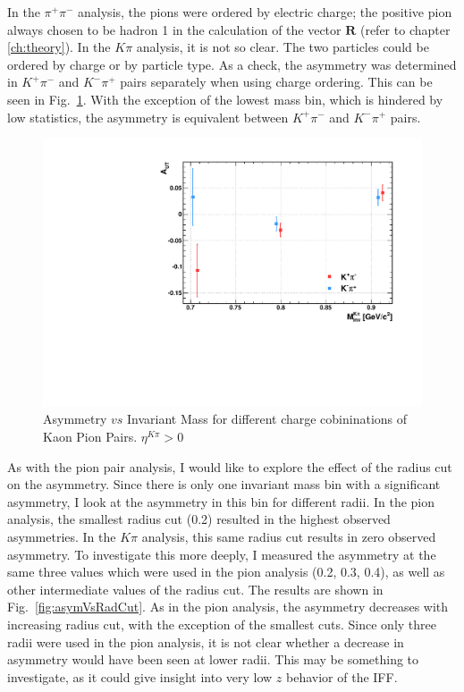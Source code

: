 \documentclass[letterpaper, abstract = on,listof=totoc, bibliography=totoc]{scrreprt}
\newcommand{\pip}{\pi^+}
\newcommand{\pim}{\pi^-}
\newcommand{\pair}{$\pip\pim$ }
\newcommand{\etakp}{\eta^{K\pi}}
\begin{document}
In the \pair analysis, the pions were ordered by electric charge; the positive pion always chosen to be hadron 1 in the calculation of the vector $\bm{R}$ (refer to chapter \ref{ch:theory}). In the $K\pi$ analysis, it is not so clear. The two particles could be ordered by charge or by particle type. As a check, the asymmetry was determined in $K^+\pi^-$ and $K^-\pi^+$ pairs separately when using charge ordering. This can be seen in Fig.~\ref{fig:mAsymSeperateCharges}. With the exception of the lowest mass bin, which is hindered by low statistics, the asymmetry is equivalent between $K^+\pi^-$ and $K^-\pi^+$ pairs. %
\begin{figure}
\begin{center}
\includegraphics[width = .6\textwidth]{mAsymSeperateCharges}
\caption[Asymmetry $vs$ Invariant Mass for different charge cobininations of Kaon Pion Pairs]{Asymmetry $vs$ Invariant Mass for different charge cobininations of Kaon Pion Pairs. $\etakp > 0$}
\label{fig:mAsymSeperateCharges}
\end{center}
\end{figure}

As with the pion pair analysis, I would like to explore the effect of the radius cut on the asymmetry. Since there is only one invariant mass bin with a significant asymmetry, I look at the asymmetry in this bin for different radii. In the pion analysis, the smallest radius cut (0.2) resulted in the highest observed asymmetries. In the $K\pi$ analysis, this same radius cut results in zero observed asymmetry. To investigate this more deeply, I measured the asymmetry at the same three values which were used in the pion analysis (0.2, 0.3, 0.4), as well as other intermediate values of the radius cut. The results are shown in Fig.~\ref{fig:asymVsRadCut}. As in the pion analysis, the asymmetry decreases with increasing radius cut, with the exception of the smallest cuts. Since only three radii were used in the pion analysis, it is not clear whether a decrease in asymmetry would have been seen at lower radii. This may be something to investigate, as it could give insight into very low $z$ behavior of the IFF. 
\end{document}
